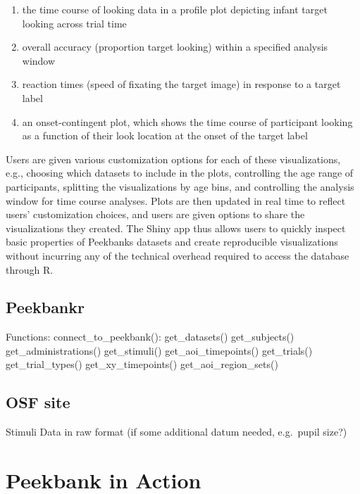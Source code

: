 \documentclass[
  english,
  man,floatsintext]{apa6}
\providecommand{\tightlist}{%
  \setlength{\itemsep}{0pt}\setlength{\parskip}{0pt}}
\begin{document}
\begin{enumerate}
\def\labelenumi{\arabic{enumi}.}
\tightlist
\item
  the time course of looking data in a profile plot depicting infant target looking across trial time
\item
  overall accuracy (proportion target looking) within a specified analysis window
\item
  reaction times (speed of fixating the target image) in response to a target label
\item
  an onset-contingent plot, which shows the time course of participant looking as a function of their look location at the onset of the target label
\end{enumerate}

Users are given various customization options for each of these visualizations, e.g., choosing which datasets to include in the plots, controlling the age range of participants, splitting the visualizations by age bins, and controlling the analysis window for time course analyses.
Plots are then updated in real time to reflect users' customization choices, and users are given options to share the visualizations they created.
The Shiny app thus allows users to quickly inspect basic properties of Peekbanks datasets and create reproducible visualizations without incurring any of the technical overhead required to access the database through R.

\hypertarget{peekbankr}{%
\subsection{Peekbankr}\label{peekbankr}}

Functions: connect\_to\_peekbank(): get\_datasets() get\_subjects() get\_administrations() get\_stimuli() get\_aoi\_timepoints() get\_trials() get\_trial\_types() get\_xy\_timepoints() get\_aoi\_region\_sets()

\hypertarget{osf-site}{%
\subsection{OSF site}\label{osf-site}}

Stimuli Data in raw format (if some additional datum needed, e.g.~pupil size?)

\hypertarget{peekbank-in-action}{%
\section{Peekbank in Action}\label{peekbank-in-action}}
\end{document}

